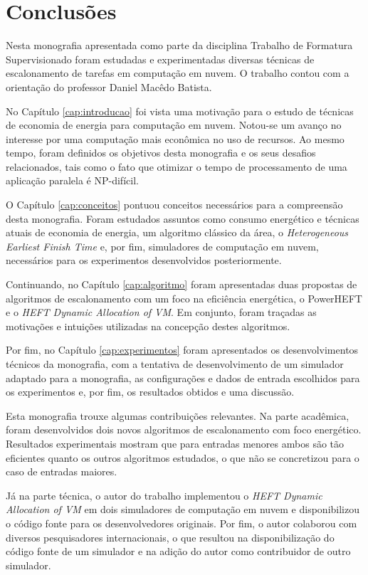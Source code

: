 \chapter{Conclusões}
\label{cap:conclusoes}

Nesta monografia apresentada como parte da disciplina Trabalho de Formatura
Supervisionado foram estudadas e experimentadas diversas técnicas de
escalonamento de tarefas em computação em nuvem. O trabalho contou com a
orientação do professor Daniel Macêdo Batista.

No Capítulo \ref{cap:introducao} foi vista uma motivação para o estudo de
técnicas de economia de energia para computação em nuvem. Notou-se um
avanço no interesse por uma computação mais econômica no uso de recursos. Ao
mesmo tempo, foram definidos os objetivos desta monografia e os seus desafios
relacionados, tais como o fato que otimizar o tempo de processamento de uma
aplicação paralela é NP-difícil.

O Capítulo \ref{cap:conceitos} pontuou conceitos necessários para a compreensão
desta monografia. Foram estudados assuntos como consumo energético e técnicas
atuais de economia de energia, um algoritmo clássico da área, o
\emph{Heterogeneous Earliest Finish Time} e, por fim, simuladores de computação
em nuvem, necessários para os experimentos desenvolvidos posteriormente.

Continuando, no Capítulo \ref{cap:algoritmo} foram apresentadas duas propostas
de algoritmos de escalonamento com um foco na eficiência energética, o PowerHEFT
e o \emph{HEFT Dynamic Allocation of VM}. Em conjunto, foram traçadas as
motivações e intuições utilizadas na concepção destes algoritmos.

Por fim, no Capítulo \ref{cap:experimentos} foram apresentados os
desenvolvimentos técnicos da monografia, com a tentativa de desenvolvimento de
um simulador adaptado para a monografia, as configurações e dados de entrada
escolhidos para os experimentos e, por fim, os resultados obtidos e uma
discussão.

Esta monografia trouxe algumas contribuições relevantes. Na parte acadêmica,
foram desenvolvidos dois novos algoritmos de escalonamento com foco energético.
Resultados experimentais mostram que para entradas menores ambos são
tão eficientes quanto os outros algoritmos estudados, o que não se concretizou
para o caso de entradas maiores.

Já na parte técnica, o autor do trabalho implementou o \emph{HEFT Dynamic
Allocation of VM} em dois simuladores de computação em nuvem e disponibilizou o 
código fonte para os desenvolvedores originais. Por fim, o autor colaborou
com diversos pesquisadores internacionais, o que resultou na disponibilização
do código fonte de um simulador e na adição do autor como contribuidor de outro
simulador.

